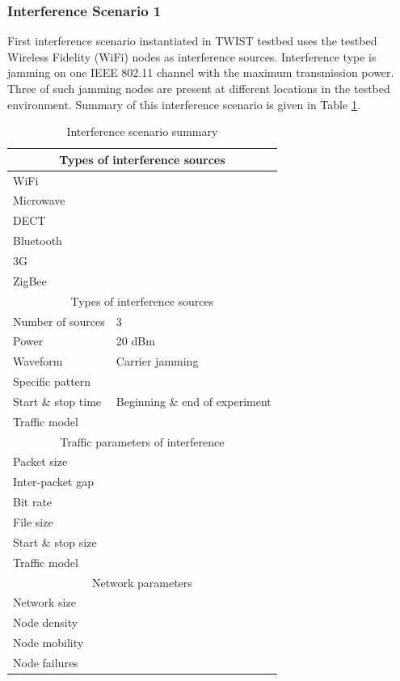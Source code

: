 \documentclass[11pt,a4paper,headinclude,footinclude,chapterprefix=on]{scrreprt}
\begin{document}
\subsubsection{Interference Scenario 1} First interference scenario instantiated in TWIST testbed uses the testbed Wireless Fidelity (WiFi) nodes as interference sources. Interference type is jamming on one IEEE 802.11 channel with the maximum transmission power. Three of such jamming nodes are present at different locations in the testbed environment. Summary of this interference scenario is given in Table \ref{tb:interf:1}.
\begin{table}
	[h] \centering \caption{Interference scenario summary} \label{tb:interf:1} 
	\begin{tabular}
		{|l|l|} \hline \multicolumn{2}{|c|}{Types of interference sources} \\
		\hline WiFi & \checkmark \\
		Microwave & \texttimes \\
		DECT & \texttimes \\
		Bluetooth & \texttimes \\
		3G & \texttimes \\
		ZigBee & \texttimes \\
		\hline \multicolumn{2}{|c|}{Types of interference sources} \\
		\hline Number of sources & 3 \\
		Power & 20 dBm \\
		Waveform & Carrier jamming \\
		Specific pattern & \\
		Start \& stop time & Beginning \& end of experiment \\
		Traffic model & \\
		\hline \multicolumn{2}{|c|}{Traffic parameters of interference} \\
		\hline Packet size & \\
		Inter-packet gap & \\
		Bit rate & \\
		File size & \\
		Start \& stop size & \\
		Traffic model & \\
		\hline \multicolumn{2}{|c|}{Network parameters} \\
		\hline Network size & \\
		Node density & \\
		Node mobility & \\
		Node failures & \\
		\hline 
	\end{tabular}
\end{table}
\end{document}
